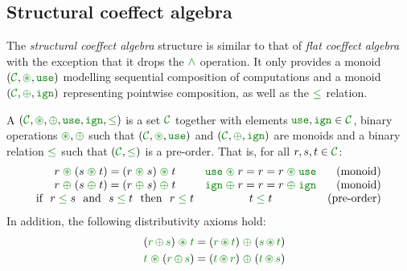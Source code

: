 
\subsection{Structural coeffect algebra}

The \emph{structural coeffect algebra} structure is similar to that of \emph{flat coeffect algebra}
with the exception that it drops the $\czip$ operation. It only provides a monoid $(\C, \cseq, \cunit)$
modelling sequential composition of computations and a monoid $(\C, \cpar, \czero)$ representing
pointwise composition, as well as the $\cleq$ relation.

\begin{definition}
\label{def:structural-scalar}
A \emph{} $(\C, \cseq, \cpar, \cunit, \czero, \cleq)$ is a set
$\C$ together with elements $\cunit, \czero \in \C$, binary operations $\cseq, \cpar$ such that
$(\C, \cseq, \cunit)$ and $(\C, \cpar, \czero)$ are monoids and a binary relation $\cleq$ such
that $(\C, \cleq)$ is a pre-order. That is, for all $r,s,t\in \C$:
%
\begin{equation*}
\begin{array}{ccr}
r \;\cseq\; (s \;\cseq\; t) = (r \;\cseq\; s) \;\cseq\; t  &
\cunit \;\cseq\; r = r = r \;\cseq\; \cunit &
\textnormal{(monoid)}
\\
r \;\cpar\; (s \;\cpar\; t) = (r \;\cpar\; s) \;\cpar\; t &
\czero \;\cpar\; r = r = r \;\cpar\; \czero &
\textnormal{(monoid)}
\\
\textnormal{if}~~r\; \cleq\; s ~~\textnormal{and}~~s\; \cleq\; t~~\textnormal{then}~~r\; \cleq\; t&
t\; \cleq\; t &
\textnormal{(pre-order)}
\\
\end{array}
\end{equation*}
%
In addition, the following distributivity axioms hold:
\begin{align*}
\quad (\cclrd{r}\, \cpar\, \cclrd{s}) \;\cseq\; \cclrd{t} & = (\cclrd{r} \,\cseq\, \cclrd{t}) \;\cpar\; (\cclrd{s}\, \cseq\, \cclrd{t}) \\
\quad \cclrd{t} \;\cseq\; (\cclrd{r}\, \cpar\, \cclrd{s}) & = (\cclrd{t} \,\cseq\, \cclrd{r}) \;\cpar\; (\cclrd{t}\, \cseq\, \cclrd{s})
\end{align*}
\end{definition}


